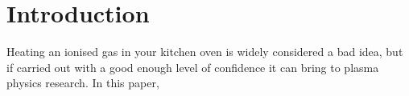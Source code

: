 \section{Introduction}
Heating an ionised gas in your kitchen oven is widely considered a bad idea, but if carried out with a good enough level of confidence it can bring to plasma physics research.
In this paper,